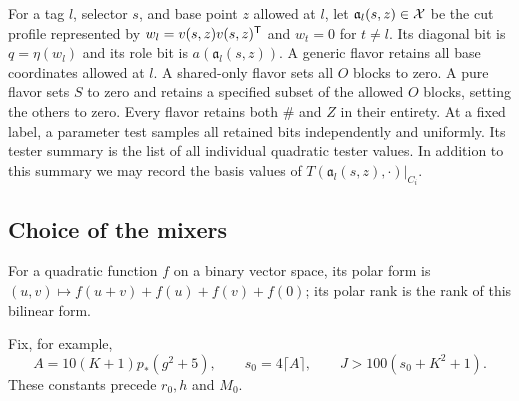 \begin{definition}\label{def:atom}
For a tag $l$, selector $s$, and base point $z$ allowed at $l$,
let $\mathfrak a_l(s,z)\in\mathcal X$ be the cut profile represented
by $w_l=v(s,z)v(s,z)^{\mathsf T}$ and $w_t=0$ for $t\ne l$.
Its diagonal bit is $q=\eta(w_l)$ and its role bit is
$a(\mathfrak a_l(s,z))$.
A generic flavor retains all base coordinates allowed at $l$.
A shared-only flavor sets all $O$ blocks to zero.  A pure flavor
sets $S$ to zero and retains a specified subset of the allowed
$O$ blocks, setting the others to zero.  Every flavor retains
both $\#$ and $Z$ in their entirety.
At a fixed label, a parameter test samples all retained bits
independently and uniformly.  Its tester summary is the list of
all individual quadratic tester values.  In addition to this
summary we may record the basis values of
$T(\mathfrak a_l(s,z),\cdot)|_{C_i}$.
\end{definition}

\subsection{Choice of the mixers}

For a quadratic function $f$ on a binary vector space, its polar form is
$(u,v)\mapsto f(u+v)+f(u)+f(v)+f(0)$; its polar rank is the rank
of this bilinear form.

Fix, for example,
\begin{equation}\label{eq:mixer-parameters}
 A=10(K+1)p_*(g^2+5),\qquad s_0=4\lceil A\rceil,
 \qquad J>100(s_0+K^2+1).
\end{equation}
These constants precede $r_0,h$ and $M_0$.

